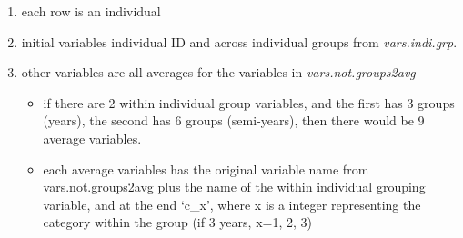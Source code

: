 \documentclass[
]{book}
\providecommand{\tightlist}{%
  \setlength{\itemsep}{0pt}\setlength{\parskip}{0pt}}
\begin{document}
\begin{enumerate}
\def\labelenumi{\arabic{enumi}.}
\tightlist
\item
  each row is an individual
\item
  initial variables individual ID and across individual groups from \emph{vars.indi.grp}.
\item
  other variables are all averages for the variables in \emph{vars.not.groups2avg}

  \begin{itemize}
  \tightlist
  \item
    if there are 2 within individual group variables, and the first has 3 groups (years), the second has 6 groups (semi-years), then there would be 9 average variables.
  \item
    each average variables has the original variable name from vars.not.groups2avg plus the name of the within individual grouping variable, and at the end `c\_x', where x is a integer representing the category within the group (if 3 years, x=1, 2, 3)
  \end{itemize}
\end{enumerate}
\end{document}
